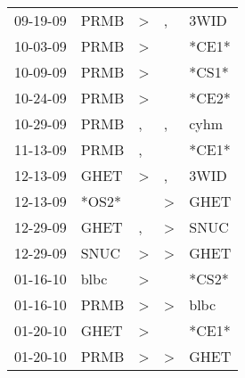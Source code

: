 \begin{supertabular}{p{0.07\textwidth}p{0.06\textwidth}p{0.02\textwidth}p{0.02\textwidth}p{0.06\textwidth}}
          09-19-09\textsuperscript{} &           PRMB\textsuperscript{} &     \textgreater &                , &           3WID\textsuperscript{} \\
          10-03-09\textsuperscript{} &           PRMB\textsuperscript{} &     \textgreater &                  &                            *CE1* \\
          10-09-09\textsuperscript{} &           PRMB\textsuperscript{} &     \textgreater &                  &                            *CS1* \\
          10-24-09\textsuperscript{} &           PRMB\textsuperscript{} &     \textgreater &                  &                            *CE2* \\
          10-29-09\textsuperscript{} &           PRMB\textsuperscript{} &                , &                , &           cyhm\textsuperscript{} \\
          11-13-09\textsuperscript{} &           PRMB\textsuperscript{} &                , &                  &                            *CE1* \\
          12-13-09\textsuperscript{} &           GHET\textsuperscript{} &     \textgreater &                , &           3WID\textsuperscript{} \\
          12-13-09\textsuperscript{} &                            *OS2* &                  &     \textgreater &           GHET\textsuperscript{} \\
          12-29-09\textsuperscript{} &           GHET\textsuperscript{} &                , &     \textgreater &           SNUC\textsuperscript{} \\
          12-29-09\textsuperscript{} &           SNUC\textsuperscript{} &     \textgreater &     \textgreater &           GHET\textsuperscript{} \\
          01-16-10\textsuperscript{} &           blbc\textsuperscript{} &     \textgreater &                  &                            *CS2* \\
          01-16-10\textsuperscript{} &           PRMB\textsuperscript{} &     \textgreater &     \textgreater &           blbc\textsuperscript{} \\
          01-20-10\textsuperscript{} &           GHET\textsuperscript{} &     \textgreater &                  &                            *CE1* \\
          01-20-10\textsuperscript{} &           PRMB\textsuperscript{} &     \textgreater &     \textgreater &           GHET\textsuperscript{} \\

\end{supertabular}
